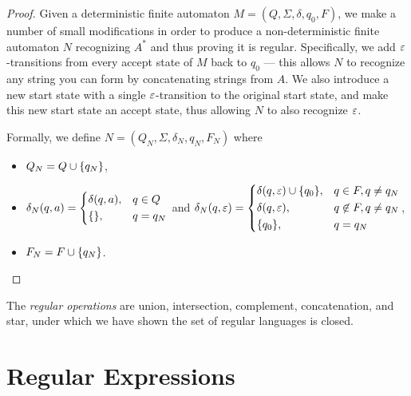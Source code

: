 \begin{proof}
    Given a deterministic finite automaton $M = (Q, \Sigma, \delta, q_0, F)$, we make a number of small modifications in order to produce a non-deterministic finite automaton $N$ recognizing $A^{*}$ and thus proving it is regular. Specifically, we add $\varepsilon$-transitions from every accept state of $M$ back to $q_0$ --- this allows $N$ to recognize any string you can form by concatenating strings from $A$. We also introduce a new start state with a single $\varepsilon$-transition to the original start state, and make this new start state an accept state, thus allowing $N$ to also recognize $\varepsilon$.

    Formally, we define $N = (Q_N, \Sigma, \delta_N, q_N, F_N)$ where
    \begin{itemize}
        \item $Q_N = Q \cup \{q_N\}$,
        \item $\delta_N(q, a) = \begin{dcases}
            \delta(q, a), &q \in Q \\
            \{\}, &q = q_N \\
        \end{dcases}$ and $\delta_N(q, \varepsilon) = \begin{dcases}
            \delta(q, \varepsilon) \cup \{q_0\}, &q \in F, q \neq q_N \\
            \delta(q, \varepsilon), &q \not\in F, q \neq q_N \\
            \{q_0\}, &q = q_N \\
        \end{dcases}$,
        \item $F_N = F \cup \{q_N\}$.
    \end{itemize}
\end{proof}

\begin{defn}
    The \emph{regular operations} are union, intersection, complement, concatenation, and star, under which we have shown the set of regular languages is closed.
\end{defn}

\section{Regular Expressions}

